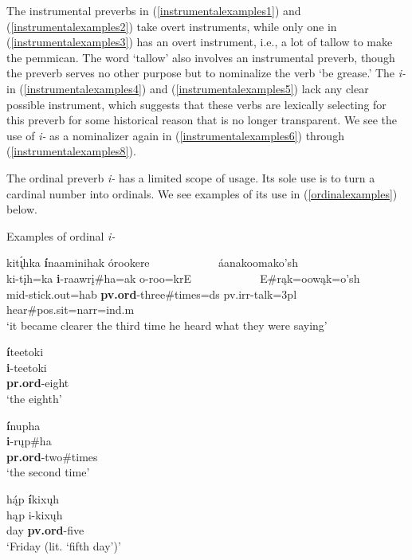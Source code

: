 The instrumental preverbs in (\ref{instrumentalexamples1}) and (\ref{instrumentalexamples2}) take overt instruments, while only one in (\ref{instrumentalexamples3}) has an overt instrument, i.e., a lot of tallow to make the pemmican. The word `tallow' also involves an instrumental preverb, though the preverb serves no other purpose but to nominalize the verb `be grease.' The \textit{i-} in (\ref{instrumentalexamples4}) and (\ref{instrumentalexamples5}) lack any clear possible instrument, which suggests that these verbs are lexically selecting for this preverb for some historical reason that is no longer transparent. We see the use of \textit{i-} as a nominalizer again in (\ref{instrumentalexamples6}) through (\ref{instrumentalexamples8}).

\label{SubParaOrdinal}

The ordinal preverb \textit{i-} has a limited scope of usage. Its sole use is to turn a cardinal number into ordinals. We see examples of its use in (\ref{ordinalexamples}) below.

\begin{exe}
\item\label{ordinalexamples} Examples of ordinal \textit{i-}

	\begin{xlist}

	\item \glll kit\'{ı̨}hka \textbf{í}naaminihak órookere ~ ~ ~ ~ ~ ~ ~ áanakoomako'sh\\
	ki-tįh=ka \textbf{i}-raawrį\#ha=ak o-roo=krE ~ ~ ~ ~ ~ ~ ~ E\#rąk=oowąk=o'sh\\
	mid-\textnormal{stick.out}=hab \textbf{pv.ord}-\textnormal{three}\#\textnormal{times}=ds pv.irr-\textnormal{talk}=3pl ~ ~ ~ ~ ~ ~ ~  \textnormal{hear}\#pos.sit=narr=ind.m\\
	\glt `it became clearer the third time he heard what they were saying' \citep[108]{hollow1973a}

	
	\item \glll \textbf{í}teetoki\\
	\textbf{i}-teetoki\\
	\textbf{pr.ord}-\textnormal{eight}\\
	\glt `the eighth' \citep[439]{hollow1970}
	
	\item \glll \textbf{í}nupha\\
	\textbf{i}-rųp\#ha\\
	\textbf{pr.ord}-\textnormal{two}\#\textnormal{times}\\
	\glt `the second time' \citep[440]{hollow1970}
	
	\item \glll hą́p \textbf{í}kixųh\\
	hąp\textbf{ }i-kixųh\\
	\textnormal{day} \textbf{pv.ord}-\textnormal{five}\\
	\glt `Friday (lit. `fifth day')' \citep[439]{hollow1970}

	\end{xlist}

\end{exe}


